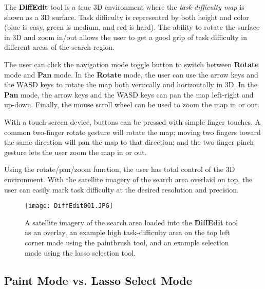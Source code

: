The \textbf{DiffEdit} tool is a true 3D environment where the \textit{task-difficulty map} is shown as a 3D surface. Task difficulty is represented by both height and color (blue is easy, green is medium, and red is hard). The ability to rotate the surface in 3D and zoom in/out allows the user to get a good grip of task difficulty in different areas of the search region.

The user can click the navigation mode toggle button to switch between \textbf{Rotate} mode and \textbf{Pan} mode. In the \textbf{Rotate} mode, the user can use the arrow keys and the WASD keys to rotate the map both vertically and horizontally in 3D. In the \textbf{Pan} mode, the arrow keys and the WASD keys can pan the map left-right and up-down. Finally, the mouse scroll wheel can be used to zoom the map in or out.

With a touch-screen device, buttons can be pressed with simple finger touches. A common two-finger rotate gesture will rotate the map; moving two fingers toward the same direction will pan the map to that direction; and the two-finger pinch gesture lets the user zoom the map in or out.

Using the rotate/pan/zoom function, the user has total control of the 3D environment. With the satellite imagery of the search area overlaid on top, the user can easily mark task difficulty at the desired resolution and precision.

\begin{figure}
\centering
\texttt{[image: DiffEdit001.JPG]}
\caption[Satellite imagery overlay and paintbrush and lasso tools examples]{A satellite imagery of the search area loaded into the \textbf{DiffEdit} tool as an overlay, an example high task-difficulty area on the top left corner made using the paintbrush tool, and an example selection made using the lasso selection tool.}
\label{DiffEdit001}
\end{figure}


\subsection{Paint Mode vs. Lasso Select Mode}

